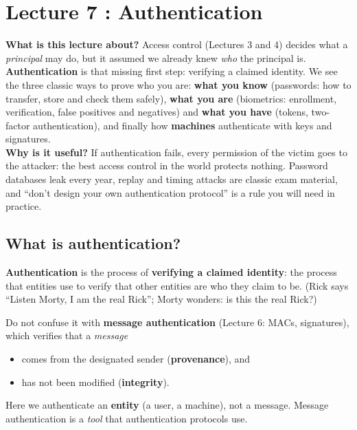 \chapter{Lecture 7 : Authentication}

\begin{rembox}[title=In a nutshell]
\textbf{What is this lecture about?} Access control (Lectures 3 and 4) decides what a
\emph{principal} may do, but it assumed we already knew \emph{who} the principal is.
\textbf{Authentication} is that missing first step: verifying a claimed identity. We see the three
classic ways to prove who you are: \textbf{what you know} (passwords: how to transfer, store and
check them safely), \textbf{what you are} (biometrics: enrollment, verification, false positives
and negatives) and \textbf{what you have} (tokens, two-factor authentication), and finally how
\textbf{machines} authenticate with keys and signatures. \\
\textbf{Why is it useful?} If authentication fails, every permission of the victim goes to the
attacker: the best access control in the world protects nothing. Password databases leak every
year, replay and timing attacks are classic exam material, and ``don't design your own
authentication protocol'' is a rule you will need in practice.
\end{rembox}

\section{What is authentication?}

\begin{defnbox}[title=Authentication]
\textbf{Authentication} is the process of \textbf{verifying a claimed identity}: the process
that entities use to verify that other entities are who they claim to be. (Rick says ``Listen
Morty, I am the real Rick''; Morty wonders: is this the real Rick?)
\end{defnbox}

\begin{warnbox}[title=Authentication $\neq$ message authentication]
Do not confuse it with \textbf{message authentication} (Lecture 6: MACs, signatures), which
verifies that a \emph{message}
\begin{itemize}
  \item comes from the designated sender (\textbf{provenance}), and
  \item has not been modified (\textbf{integrity}).
\end{itemize}
Here we authenticate an \textbf{entity} (a user, a machine), not a message. Message
authentication is a \emph{tool} that authentication protocols use.
\end{warnbox}

